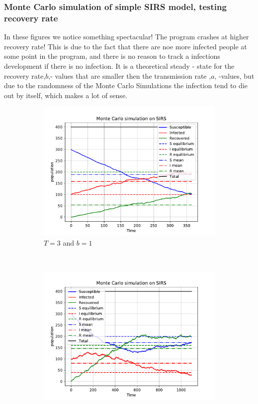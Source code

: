 \subsubsection{Monte Carlo simulation of simple SIRS model, testing recovery rate}
	In these figures we notice something spectacular! The program crashes at higher recovery rate! This is due to the fact that there are noe more infected people at some point in the program, and there is no reason to track a infections development if there is no infection. It is a theoretical steady - state for the recovery rate,$b$,- values that are smaller then the transmission rate ,$a$, -values, but due to the randomness of the Monte Carlo Simulations the infection tend to die out by itself, which makes a lot of sense. 
	 
\begin{figure}[H]
    \centering
    \begin{subfigure}{0.49\textwidth}
        \centering
        \includegraphics[width=\linewidth]{../fig/newfig/MC_b1T1.pdf}
        \caption{$T = 3$ and $b =1$}
    \end{subfigure}%
     ~ 
    \begin{subfigure}{0.49\textwidth}
         \centering
         \includegraphics[width=\linewidth]{../fig/newfig/MC_b2T3.pdf}

\end{subfigure}
\end{figure}
